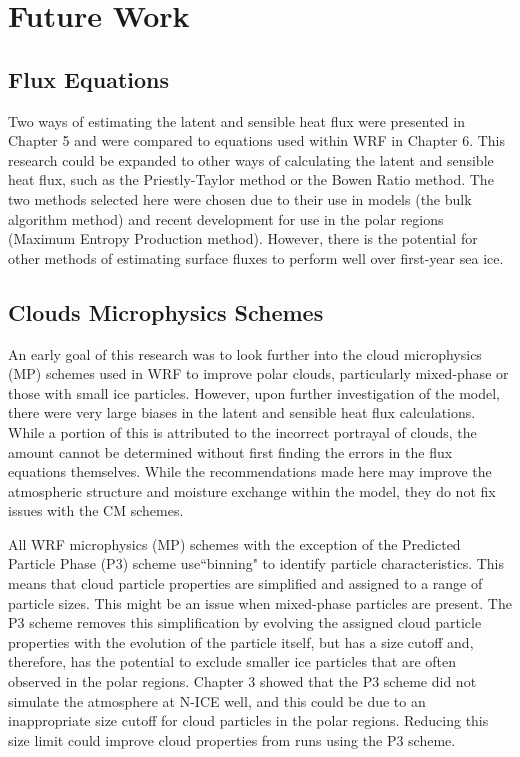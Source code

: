 \section{Future Work}
\subsection{Flux Equations}
Two ways of estimating the latent and sensible heat flux were presented in Chapter 5 and were compared to equations used within WRF in Chapter 6. This research could be expanded to other ways of calculating the latent and sensible heat flux, such as the Priestly-Taylor method or the Bowen Ratio method. The two methods selected here were chosen due to their use in models (the bulk algorithm method) and recent development for use in the polar regions (Maximum Entropy Production method). However, there is the potential for other methods of estimating surface fluxes to perform well over first-year sea ice.

\subsection{Clouds Microphysics Schemes}
An early goal of this research was to look further into the cloud microphysics (MP) schemes used in WRF to improve polar clouds, particularly mixed-phase or those with small ice particles. However, upon further investigation of the model, there were very large biases in the latent and sensible heat flux calculations. While a portion of this is attributed to the incorrect portrayal of clouds, the amount cannot be determined without first finding the errors in the flux equations themselves. While the recommendations made here may improve the atmospheric structure and moisture exchange within the model, they do not fix issues with the CM schemes. 

All WRF microphysics (MP) schemes with the exception of the Predicted Particle Phase (P3) scheme use``binning" to identify particle characteristics. This means that cloud particle properties are simplified and assigned to a range of particle sizes. This might be an issue when mixed-phase particles are present. The P3 scheme removes this simplification by evolving the assigned cloud particle properties with the evolution of the particle itself, but has a size cutoff and, therefore, has the potential to exclude smaller ice particles that are often observed in the polar regions. Chapter 3 showed that the P3 scheme did not simulate the atmosphere at N-ICE well, and this could be due to an inappropriate size cutoff for cloud particles in the polar regions. Reducing this size limit could improve cloud properties from runs using the P3 scheme.

